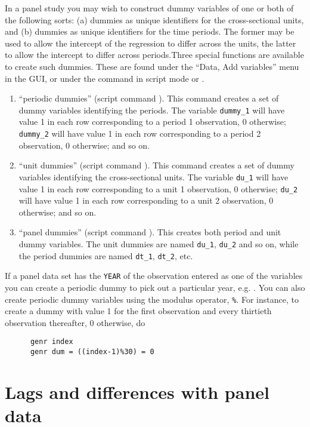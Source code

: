 In a panel study you may wish to construct dummy variables
      of one or both of the following sorts: (a) dummies as unique
      identifiers for the cross-sectional units, and (b) dummies as
      unique identifiers for the time periods.  The former may be used
      to allow the intercept of the regression to differ across the
      units, the latter to allow the intercept to differ across
      periods.Three special functions are available to create such dummies.
      These are found under the ``Data, Add variables''
      menu in the GUI, or under the  command in
      script mode or .
\begin{enumerate}
\item ``periodic dummies'' (script command
	  ).  This command creates a set
	  of dummy variables identifying the periods.  The variable
	  \verb+dummy_1+ will have value 1 in each row
	  corresponding to a period 1 observation, 0 otherwise;
	  \verb+dummy_2+ will have value 1 in each row
	  corresponding to a period 2 observation, 0 otherwise; and so
	  on.
\item ``unit dummies'' (script command
	  ).  This command creates a
	  set of dummy variables identifying the cross-sectional
	  units.  The variable \verb+du_1+ will have value
	  1 in each row corresponding to a unit 1 observation, 0
	  otherwise; \verb+du_2+ will have value 1 in each
	  row corresponding to a unit 2 observation, 0 otherwise; and
	  so on.
\item ``panel dummies'' (script command
	  ).  This creates both period
	  and unit dummy variables. The unit dummies are named
	  \verb+du_1+, \verb+du_2+ and so on,
	  while the period dummies are named \verb+dt_1+,
	  \verb+dt_2+, etc.
\end{enumerate}

If a panel data set has the \verb+YEAR+ of the
      observation entered as one of the variables you can create a
      periodic dummy to pick out a particular year, e.g. .  You can also create periodic
      dummy variables using the modulus operator,
      \verb+%+.  For instance, to create a dummy with
      value 1 for the first observation and every thirtieth
      observation thereafter, 0 otherwise, do
\begin{verbatim}
      genr index 
      genr dum = ((index-1)%30) = 0
    \end{verbatim}


\section{Lags and differences with panel
      data}
\label{panel-lagged}

